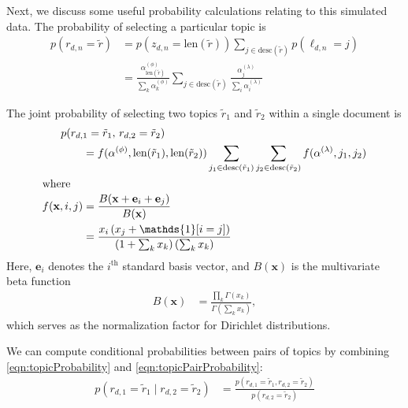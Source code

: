 \documentclass{article}
\newcommand{\nth}{^{\text{th}}}
\newcommand{\len}{\text{len}}
\newcommand{\indicator}{\mathds{1}}
\begin{document}
Next, we discuss some useful probability calculations relating to this simulated data.
The probability of selecting a particular topic is
\begin{align}
p(r_{d,n} = \tilde r)
&= p(z_{d,n} = \len(\tilde r)) \sum_{j \in \text{desc}(\tilde r)} p(\ell_{d,n} = j) \\
&= \frac{\alpha^{(\phi)}_{\len(\tilde r)}}{\sum_k \alpha^{(\phi)}_k} \sum_{j \in \text{desc}(\tilde r)} \frac{\alpha^{(\lambda)}_j}{\sum_i \alpha^{(\lambda)}_i} \label{eqn:topicProbability}
\end{align}

The joint probability of selecting two topics $\tilde r_1$ and $\tilde r_2$ within a single document is
\begin{align}
\MoveEqLeft
p(r_{d,1} = \tilde r_1, \, r_{d,2} = \tilde r_2) \nonumber \\
&= f(\alpha^{(\phi)}, \len(\tilde r_1), \len(\tilde r_2))
  \sum_{j_1 \in \text{desc}(\tilde r_1)}
  \sum_{j_2 \in \text{desc}(\tilde r_2)}
    f(\alpha^{(\lambda)}, j_1, j_2) \label{eqn:topicPairProbability} \\
\intertext{where}
f(\mathbf x, i, j)
&=
\frac{B(\mathbf x + \mathbf e_i + \mathbf e_j)}{B(\mathbf x)}
\\
&=
\frac{x_i \left( x_j + \indicator[i = j] \right)}{\left(1 + \sum_k x_k\right) \left(\sum_k x_k\right)}
\end{align}
Here, $\mathbf e_i$ denotes the $i\nth$ standard basis vector, and $B(\mathbf x)$ is the multivariate beta function
\begin{align}
B(\mathbf x)
&= \frac{\prod_k \Gamma(x_k)}{\Gamma\left(\sum_k x_k\right)},
\end{align}
which serves as the normalization factor for Dirichlet distributions.

We can compute conditional probabilities between pairs of topics by combining \eqref{eqn:topicProbability} and \eqref{eqn:topicPairProbability}:
\begin{align}
p(r_{d,1} = \tilde r_1 \mid r_{d,2} = \tilde r_2)
&= \frac{ p(r_{d,1} = \tilde r_1, r_{d,2} = \tilde r_2) }{ p(r_{d,2} = \tilde r_2) }
\end{align}
\end{document}

